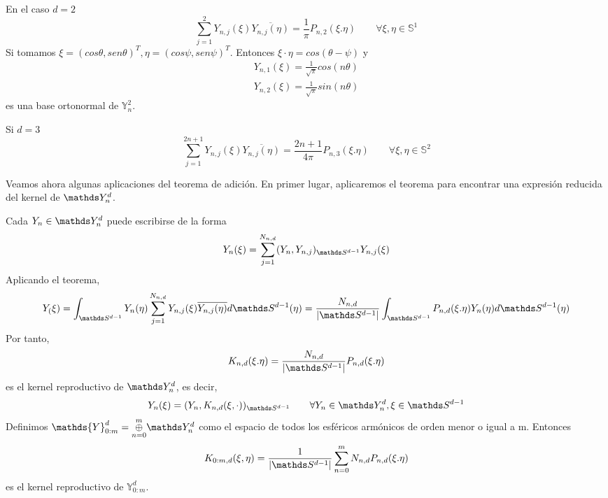 \medskip 

\begin{example}En el caso $d=2$ $$
	\sum_{j=1}^{2}Y_{n,j}(\xi)\overline{Y_{n,j}(\eta)} = \frac{1}{\pi}P_{n,2}(\xi.\eta)	\qquad	\forall \xi,\eta \in \mathds{S}^{1}
	$$
Si tomamos $\xi= (cos \theta,sen \theta)^T, \eta=(cos \psi,sen \psi)^T$. Entonces $\xi\cdot\eta = cos(\theta - \psi)$ y 
\begin{gather}\label{base_d2}
Y_{n,1}(\xi) = \frac{1}{\sqrt{\pi}} cos(n\theta) \\
Y_{n,2}(\xi) = \frac{1}{\sqrt{\pi}} sin(n\theta) 
\end{gather}
es una base ortonormal de $\mathds{Y}^2_n$.
\end{example}
\begin{example}Si $d=3$ $$
	\sum_{j=1}^{2n+1}Y_{n,j}(\xi)\overline{Y_{n,j}(\eta)} = \frac{2n+1}{4\pi}P_{n,3}(\xi.\eta)\qquad		\forall \xi,\eta \in \mathds{S}^{2}
$$	
\end{example}
Veamos ahora algunas aplicaciones del teorema de adición. En primer lugar, aplicaremos el teorema para encontrar una expresión reducida del kernel de $\spharm$.
\medskip

Cada $Y_n \in \spharm$ puede escribirse de la forma
$$Y_n(\xi) = \sum_{j=1}^{N_{n,d}} (Y_n,Y_{n,j})_{\sphere} Y_{n,j}(\xi)$$
Aplicando el teorema,
$$Y_(\xi)=\int_{\sphere} Y_n(\eta)\sum_{j=1}^{N_{n,d}}Y_{n,j}(\xi)\overline{Y_{n,j}(\eta)}d\sphere(\eta) = \frac{N_{n,d}}{|\sphere|}\int_{\sphere}P_{n,d}(\xi.\eta)Y_n(\eta)d\sphere(\eta)$$
Por tanto, $$
K_{n,d}(\xi.\eta)= \frac{N_{n,d}}{|\sphere|}P_{n,d}(\xi.\eta)
$$
es el kernel reproductivo de $\spharm$, es decir, $$
Y_n(\xi) = (Y_n,K_{n,d}(\xi,\cdot))_{\sphere} \qquad \forall Y_n \in \spharm, \xi \in \sphere$$
Definimos $\mathds{Y}_{0:m}^d = \underset{n=0}{\overset{m}{\oplus}} \spharm$ como el espacio de todos los esféricos armónicos de orden menor o igual a m. Entonces 
$${K}_{0:m,d}(\xi,\eta) = \frac{1}{|\sphere|}\sum_{n=0}^{m}N_{n,d}P_{n,d}(\xi.\eta)$$ es el kernel reproductivo de  $\mathds{Y}_{0:m}^d$.
\medskip


